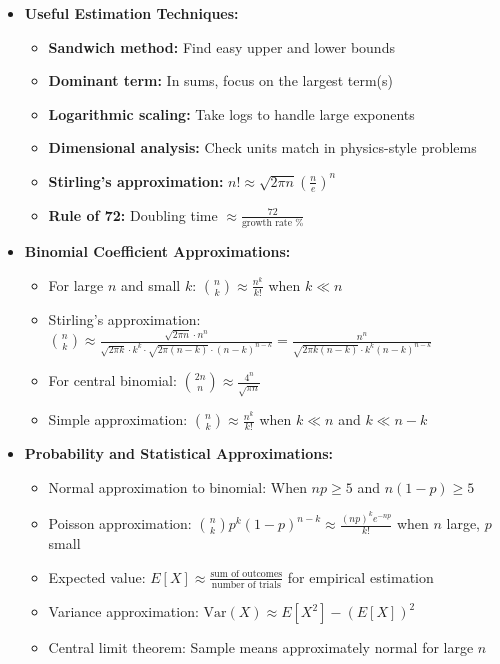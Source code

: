 \documentclass[12pt]{article}
\begin{document}
\begin{itemize}
    \item \textbf{Useful Estimation Techniques:}
    \begin{itemize}
        \item \textbf{Sandwich method:} Find easy upper and lower bounds
        \item \textbf{Dominant term:} In sums, focus on the largest term(s)
        \item \textbf{Logarithmic scaling:} Take logs to handle large exponents
        \item \textbf{Dimensional analysis:} Check units match in physics-style problems
        \item \textbf{Stirling's approximation:} $n! \approx \sqrt{2\pi n}\left(\frac{n}{e}\right)^n$
        \item \textbf{Rule of 72:} Doubling time $\approx \frac{72}{\text{growth rate \%}}$
    \end{itemize}
    
    \item \textbf{Binomial Coefficient Approximations:}
    \begin{itemize}
        \item For large $n$ and small $k$: $\binom{n}{k} \approx \frac{n^k}{k!}$ when $k \ll n$
        \item Stirling's approximation: $\binom{n}{k} \approx \frac{\sqrt{2\pi n} \cdot n^n}{\sqrt{2\pi k} \cdot k^k \cdot \sqrt{2\pi (n-k)} \cdot (n-k)^{n-k}} = \frac{n^n}{\sqrt{2\pi k(n-k)} \cdot k^k (n-k)^{n-k}}$
        \item For central binomial: $\binom{2n}{n} \approx \frac{4^n}{\sqrt{\pi n}}$
        \item Simple approximation: $\binom{n}{k} \approx \frac{n^k}{k!}$ when $k \ll n$ and $k \ll n-k$
    \end{itemize}
    
    \item \textbf{Probability and Statistical Approximations:}
    \begin{itemize}
        \item Normal approximation to binomial: When $np \geq 5$ and $n(1-p) \geq 5$
        \item Poisson approximation: $\binom{n}{k}p^k(1-p)^{n-k} \approx \frac{(np)^k e^{-np}}{k!}$ when $n$ large, $p$ small
        \item Expected value: $E[X] \approx \frac{\text{sum of outcomes}}{\text{number of trials}}$ for empirical estimation
        \item Variance approximation: $\text{Var}(X) \approx E[X^2] - (E[X])^2$
        \item Central limit theorem: Sample means approximately normal for large $n$
    \end{itemize}
    

\end{itemize}
\end{document}
